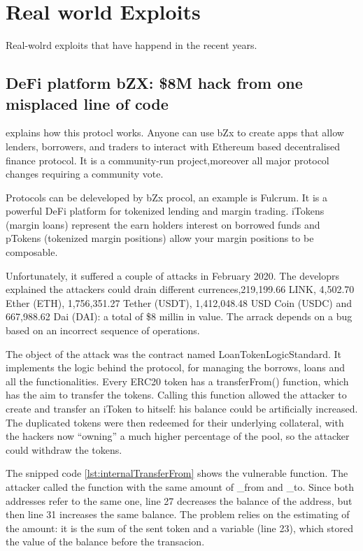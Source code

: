 \chapter{Real world Exploits}
\label{ch:Exploits}
Real-wolrd exploits that have happend in the recent years.

\section{DeFi platform bZX: \$8M hack from one misplaced line of code}
\label{sec:Exploits:bZX}

\citet{bZxProtocol} explains how this protocl works. 
Anyone can use bZx to create apps that allow lenders, borrowers, and traders to interact with Ethereum based 
decentralised finance protocol.
It is a community-run project,moreover all major protocol changes requiring a community vote. 

Protocols can be deleveloped by bZx procol, an example is Fulcrum. 
It is a powerful DeFi platform for tokenized lending and margin trading. 
iTokens (margin loans) represent the earn holders interest on borrowed funds and pTokens (tokenized margin positions) allow your margin positions to be composable.

Unfortunately, it suffered a couple of attacks in February 2020.
The developrs explained the attackers could drain different currences,219,199.66 LINK, 4,502.70 Ether (ETH), 1,756,351.27 Tether (USDT), 
1,412,048.48 USD Coin (USDC) and 667,988.62 Dai (DAI): a total of \$8 millin in value. 
The arrack depends on a bug based on an incorrect sequence of operations.

The object of the attack was the contract named LoanTokenLogicStandard.
It implements the logic behind the protocol, for managing the borrows, loans and all the functionalities.
Every ERC20 token has a transferFrom() function, which has the aim to transfer the tokens.
Calling this function allowed the attacker to create and transfer an iToken to hitself: his balance could be artificially increased.
The duplicated tokens were then redeemed for their underlying collateral, 
with the hackers now “owning” a much higher percentage of the pool, so the attacker could withdraw the tokens.

The snipped code \autoref{lst:internalTransferFrom} shows the vulnerable function. 
The attacker called the function with the same amount of \_from and \_to. 
Since both addresses refer to the same one, line 27 decreases the balance of the address, but then line 31 increases the same balance. 
The problem relies on the estimating of the amount: it is the sum of the sent token and 
a variable (line 23), which stored the value of the balance before the transacion.


